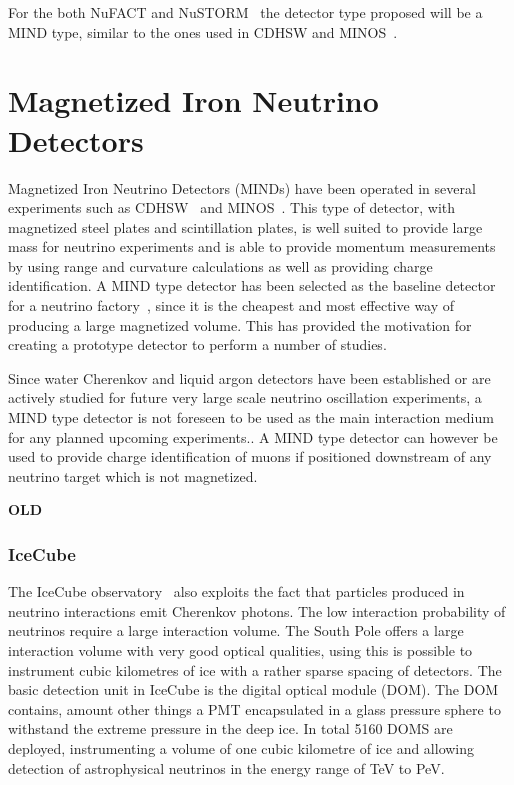 For the both NuFACT and NuSTORM~\cite{77nustorm} the detector type proposed will be a MIND type, similar to the ones used in CDHSW and MINOS~\cite{NuFACTIDS}.

\pagebreak
\section{Magnetized Iron Neutrino Detectors}\label{subsec:MINDdetector}

Magnetized Iron Neutrino Detectors (MINDs) have been operated in several experiments such as CDHSW~\cite{40CDHSW} and MINOS~\cite{MINOS}. This type of detector, with magnetized steel plates and scintillation plates, is well suited to provide large mass for neutrino experiments and is able to provide momentum measurements by using range and curvature calculations as well as providing charge identification. A MIND type detector has been selected as the baseline detector for a neutrino factory~\cite{ISS, 27Bross}, since it is the cheapest and most effective way of producing a large magnetized volume. This has provided the motivation for creating a prototype detector to perform a number of studies.

Since water Cherenkov and liquid argon detectors have been established or are actively studied for future very large scale neutrino oscillation experiments, a MIND type detector is not foreseen to be used as the main interaction medium for any planned upcoming experiments.. A MIND type detector can however be used to provide charge identification of muons if positioned downstream of any neutrino target which is not magnetized.

\textbf{OLD}

\subsubsection{IceCube}
The IceCube observatory~\cite{43IceCube} also exploits the fact that particles produced in neutrino interactions emit Cherenkov photons. The low interaction probability of neutrinos require a large interaction volume. The South Pole offers a large interaction volume with very good optical qualities, using this is possible to instrument cubic kilometres of ice with a rather sparse spacing of detectors. The basic detection unit in IceCube is the digital optical module (DOM). The DOM contains, amount other things a PMT encapsulated in a glass pressure sphere to withstand the extreme pressure in the deep ice. In total 5160 DOMS are deployed, instrumenting a volume of one cubic kilometre of ice and allowing detection of astrophysical neutrinos in the energy range of TeV to PeV.

